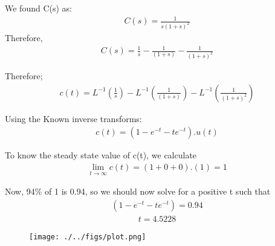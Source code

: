 
\textsf{We found C(s) as:}
\begin{multline}
C(s) =  \frac{1}{s(1+s)^2}
\end{multline}
\textsf{Therefore,}
\begin{multline}
C(s) = \frac{1}{s} - \frac{1}{(1+s)} - \frac{1}{(1+s)^2}
\end{multline}

\textsf{Therefore;}
\begin{multline}
c(t) = L^{-1} ( \frac{1}{s}) - L^{-1}(\frac{1}{(1+s)}) - L^{-1}(\frac{1}{(1+s)^2}) 
\end{multline}

\textsf{Using the Known inverse transforms:}
\begin{multline}
c(t) = (1 - e^{-t} - te^{-t}) . u(t)
\end{multline}



\textsf{To know the steady state value of c(t), we calculate }
\begin{multline}
\lim_{t\to\infty} c(t) = (1+0+0).(1) = 1
\end{multline}

\textsf{Now, 94\% of 1 is 0.94, so we should now solve for a positive t such that}
\begin{multline}
(1 - e^{-t} - te^{-t}) = 0.94
\end{multline}
\begin{multline}
 t = 4.5228
\end{multline}
\begin{figure}
\texttt{[image: ./../figs/plot.png]}

\end{figure}
%